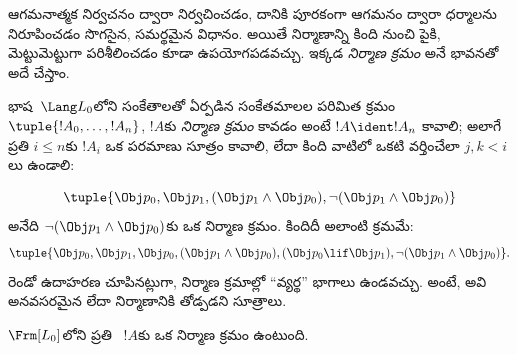 \documentclass[../../../include/open-logic-section]{subfiles}
\begin{document}


ఆగమనాత్మక నిర్వచనం ద్వారా  నిర్వచించడం, దానికి
పూరకంగా ఆగమనం ద్వారా  ధర్మాలను నిరూపించడం సొగసైన,
సమర్థమైన విధానం. అయితే  నిర్మాణాన్ని కింది నుంచి పైకి,
మెట్టుమెట్టుగా పరిశీలించడం కూడా ఉపయోగపడవచ్చు. ఇక్కడ
\emph{నిర్మాణ క్రమం} అనే భావనతో అదే చేస్తాం.

\begin{defn}[సూత్రాల నిర్మాణ క్రమాలు]
భాష~$\Lang L_0$లోని సంకేతాలతో ఏర్పడిన సంకేతమాలల పరిమిత క్రమం
$\tuple{!A_0,\dotsc,!A_n}$, $!A$కు \emph{నిర్మాణ క్రమం} కావడం
అంటే $!A \ident !A_n$ కావాలి; అలాగే ప్రతి $i \leq n$కు $!A_i$ ఒక పరమాణు
సూత్రం కావాలి, లేదా కింది వాటిలో ఒకటి వర్తించేలా $j,k < i$లు ఉండాలి:
\begin{enumerate}
\end{enumerate}
\end{defn}

\begin{ex}
\[
\tuple{
    \Obj p_0,
    \Obj p_1,
    (\Obj p_1 \land \Obj p_0),
    \lnot (\Obj p_1 \land \Obj p_0)
}
\]
అనేది $\lnot (\Obj p_1 \land \Obj p_0)$కు ఒక నిర్మాణ క్రమం.
కిందిదీ అలాంటి క్రమమే:
\[
\tuple{
    \Obj p_0,
    \Obj p_1,
    \Obj p_0,
    (\Obj p_1 \land \Obj p_0),
    (\Obj p_0 \lif \Obj p_1),
    \lnot (\Obj p_1 \land \Obj p_0)
}.
\]
%
రెండో ఉదాహరణ చూపినట్లుగా, నిర్మాణ క్రమాల్లో “వ్యర్థ” భాగాలు
ఉండవచ్చు. అంటే, అవి అనవసరమైన లేదా నిర్మాణానికి తోడ్పడని సూత్రాలు.
\end{ex}

\begin{prop}
$\Frm[L_0]$లోని ప్రతి ~$!A$కు ఒక నిర్మాణ క్రమం ఉంటుంది.
\end{prop}
\end{document}
